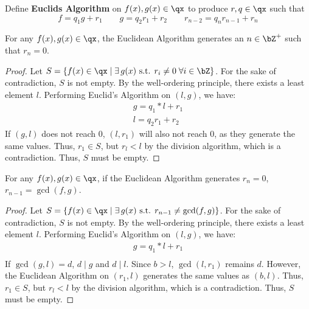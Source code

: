 \begin{definition}
    Define \textbf{Euclids Algorithm} on $f(x), g(x) \in \qx$ to produce $r,q \in \qx$ such that 
    \[
        f = q_1g + r_1 \qquad 
        g = q_2r_1+r_2 \qquad
        r_{n-2} = q_n r_{n-1} + r_n
    \]
\end{definition}
\begin{lemma} For any $f(x), g(x) \in \qx$, the Euclidean Algorithm generates an $n \in \bZ^+$ such that $r_n=0$.\end{lemma}
\begin{proof}
    Let $S=\left\{ f(x) \in \qx \;\middle | \;\exists \, g(x) \text{ s.t. } r_i \neq 0 \; \forall i \in \bZ \right\}$. For the sake of contradiction, $S$ is not empty. By the well-ordering principle, there exists a least element $l$. Performing Euclid's Algorithm on $(l,g)$, we have:
    \begin{gather*}
        g = q_1*l + r_1 \\
        l = q_2 r_1 + r_2
    \end{gather*}
If $(g,l)$ does not reach 0, $(l, r_1)$ will also not reach 0, as they generate the same values. Thus, $r_1\in S$, but $r_l<l$ by the division algorithm, which is a contradiction. Thus, $S$ must be empty.
\end{proof}

\begin{lemma} For any $f(x), g(x) \in \qx$, if the Euclidean Algorithm generates $r_n=0$, $r_{n-1} = \gcd(f, g)$.\end{lemma}
\begin{proof}
    Let $S=\left\{ f(x) \in \qx \;\middle | \;\exists \, g(x) \text{ s.t. } r_{n-1} \neq \gcd(f, g) \right\}$. For the sake of contradiction, $S$ is not empty. By the well-ordering principle, there exists a least element $l$. Performing Euclid's Algorithm on $(l,g)$, we have:
    \begin{gather*}
        g = q_1*l + r_1 \\
    \end{gather*}
If $\gcd(g,l) = d$, $d \mid g$ and $d \mid l$. Since $b>l$, $\gcd(l, r_1)$ remains $d$. However, the Euclidean Algorithm on $(r_1, l)$ generates the same values as $(b, l)$. Thus, $r_1\in S$, but $r_l<l$ by the division algorithm, which is a contradiction. Thus, $S$ must be empty.
\end{proof}
